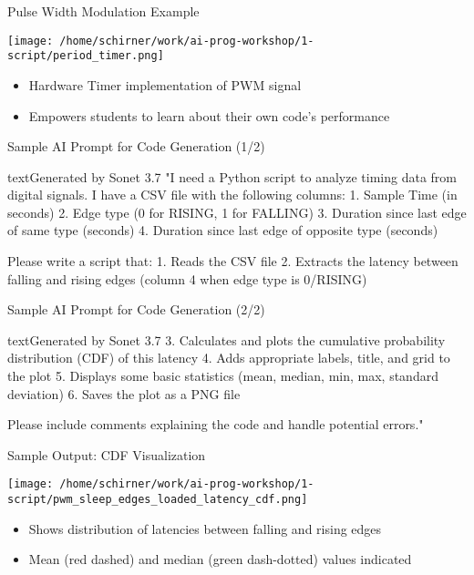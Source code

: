 \documentclass[xcolor={dvipsnames}, aspectratio=169]{beamer}
\begin{document}
\begin{frame}{Pulse Width Modulation Example}
  \begin{center}
    \texttt{[image: /home/schirner/work/ai-prog-workshop/1-script/period\_timer.png]}
  \end{center}
  \begin{itemize}
    \item Hardware Timer implementation of PWM signal
    \item Empowers students to learn about their own code's performance
  \end{itemize}
\end{frame}

\begin{frame}[fragile]{Sample AI Prompt for Code Generation (1/2)}
  \begin{codeboxtc}{text}{Generated by Sonet 3.7}{}{}
"I need a Python script to analyze timing data from digital signals. I have a CSV file with the following columns:
1. Sample Time (in seconds)
2. Edge type (0 for RISING, 1 for FALLING)
3. Duration since last edge of same type (seconds)
4. Duration since last edge of opposite type (seconds)

Please write a script that:
1. Reads the CSV file
2. Extracts the latency between falling and rising edges (column 4 when edge type is 0/RISING)
  \end{codeboxtc}
\end{frame}

\begin{frame}[fragile]{Sample AI Prompt for Code Generation (2/2)}
  \begin{codeboxtc}{text}{Generated by Sonet 3.7}{}{}
3. Calculates and plots the cumulative probability distribution (CDF) of this latency
4. Adds appropriate labels, title, and grid to the plot
5. Displays some basic statistics (mean, median, min, max, standard deviation)
6. Saves the plot as a PNG file

Please include comments explaining the code and handle potential errors."
  \end{codeboxtc}
\end{frame}

\begin{frame}{Sample Output: CDF Visualization}
  \begin{center}
    \texttt{[image: /home/schirner/work/ai-prog-workshop/1-script/pwm\_sleep\_edges\_loaded\_latency\_cdf.png]}
  \end{center}
  \begin{itemize}
    \item Shows distribution of latencies between falling and rising edges
    \item Mean (red dashed) and median (green dash-dotted) values indicated
  \end{itemize}
\end{frame}
\end{document}
